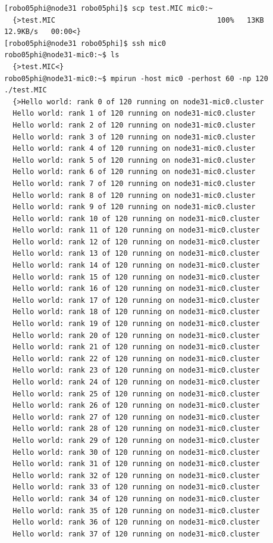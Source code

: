 \documentclass[pscyr,10pt]{hedlab}
\begin{document}
\begin{lstlisting}
[robo05phi@node31 robo05phi]$ scp test.MIC mic0:~
  {>test.MIC                                      100%   13KB  12.9KB/s   00:00<}
[robo05phi@node31 robo05phi]$ ssh mic0
robo05phi@node31-mic0:~$ ls
  {>test.MIC<}
robo05phi@node31-mic0:~$ mpirun -host mic0 -perhost 60 -np 120 ./test.MIC
  {>Hello world: rank 0 of 120 running on node31-mic0.cluster
  Hello world: rank 1 of 120 running on node31-mic0.cluster
  Hello world: rank 2 of 120 running on node31-mic0.cluster
  Hello world: rank 3 of 120 running on node31-mic0.cluster
  Hello world: rank 4 of 120 running on node31-mic0.cluster
  Hello world: rank 5 of 120 running on node31-mic0.cluster
  Hello world: rank 6 of 120 running on node31-mic0.cluster
  Hello world: rank 7 of 120 running on node31-mic0.cluster
  Hello world: rank 8 of 120 running on node31-mic0.cluster
  Hello world: rank 9 of 120 running on node31-mic0.cluster
  Hello world: rank 10 of 120 running on node31-mic0.cluster
  Hello world: rank 11 of 120 running on node31-mic0.cluster
  Hello world: rank 12 of 120 running on node31-mic0.cluster
  Hello world: rank 13 of 120 running on node31-mic0.cluster
  Hello world: rank 14 of 120 running on node31-mic0.cluster
  Hello world: rank 15 of 120 running on node31-mic0.cluster
  Hello world: rank 16 of 120 running on node31-mic0.cluster
  Hello world: rank 17 of 120 running on node31-mic0.cluster
  Hello world: rank 18 of 120 running on node31-mic0.cluster
  Hello world: rank 19 of 120 running on node31-mic0.cluster
  Hello world: rank 20 of 120 running on node31-mic0.cluster
  Hello world: rank 21 of 120 running on node31-mic0.cluster
  Hello world: rank 22 of 120 running on node31-mic0.cluster
  Hello world: rank 23 of 120 running on node31-mic0.cluster
  Hello world: rank 24 of 120 running on node31-mic0.cluster
  Hello world: rank 25 of 120 running on node31-mic0.cluster
  Hello world: rank 26 of 120 running on node31-mic0.cluster
  Hello world: rank 27 of 120 running on node31-mic0.cluster
  Hello world: rank 28 of 120 running on node31-mic0.cluster
  Hello world: rank 29 of 120 running on node31-mic0.cluster
  Hello world: rank 30 of 120 running on node31-mic0.cluster
  Hello world: rank 31 of 120 running on node31-mic0.cluster
  Hello world: rank 32 of 120 running on node31-mic0.cluster
  Hello world: rank 33 of 120 running on node31-mic0.cluster
  Hello world: rank 34 of 120 running on node31-mic0.cluster
  Hello world: rank 35 of 120 running on node31-mic0.cluster
  Hello world: rank 36 of 120 running on node31-mic0.cluster
  Hello world: rank 37 of 120 running on node31-mic0.cluster

\end{lstlisting}
\end{document}
